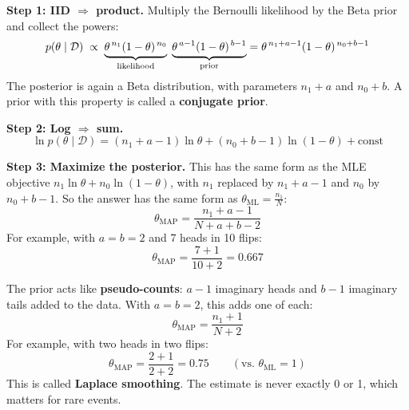 \begin{keeptogether}
\textbf{Step 1: IID $\Rightarrow$ product.} Multiply the Bernoulli likelihood by the Beta prior and collect the powers:
\[
p(\theta \mid \mathcal{D}) \;\propto\; \underbrace{\theta^{\,n_1}(1-\theta)^{\,n_0}}_{\makebox[0pt]{\scriptsize likelihood}}\;\underbrace{\theta^{\,a-1}(1-\theta)^{\,b-1}}_{\makebox[0pt]{\scriptsize prior}} = \theta^{\,n_1+a-1}(1-\theta)^{\,n_0+b-1}
\]
The posterior is again a Beta distribution, with parameters $n_1 + a$ and $n_0 + b$. A prior with this property is called a \textbf{conjugate prior}.
\end{keeptogether}

\begin{keeptogether}
\textbf{Step 2: Log $\Rightarrow$ sum.}
\[
\ln p(\theta \mid \mathcal{D}) = (n_1 + a - 1)\ln\theta + (n_0 + b - 1)\ln(1-\theta) + \text{const}
\]
\end{keeptogether}

\begin{keeptogether}
\textbf{Step 3: Maximize the posterior.} This has the same form as the MLE objective $n_1 \ln\theta + n_0\ln(1-\theta)$, with $n_1$ replaced by $n_1 + a - 1$ and $n_0$ by $n_0 + b - 1$. So the answer has the same form as $\theta_{\text{ML}} = \tfrac{n_1}{N}$:
\[
\theta_{\text{MAP}} = \frac{n_1 + a - 1}{N + a + b - 2}
\]
For example, with $a = b = 2$ and 7 heads in 10 flips:
\[
\theta_{\text{MAP}} = \frac{7 + 1}{10 + 2} = 0.667
\]
\end{keeptogether}

\begin{keeptogether}
The prior acts like \textbf{pseudo-counts}: $a - 1$ imaginary heads and $b - 1$ imaginary tails added to the data. With $a = b = 2$, this adds one of each:
\[
\theta_{\text{MAP}} = \frac{n_1 + 1}{N + 2}
\]
For example, with two heads in two flips:
\[
\theta_{\text{MAP}} = \frac{2 + 1}{2 + 2} = 0.75 \qquad (\text{vs. } \theta_{\text{ML}} = 1)
\]
This is called \textbf{Laplace smoothing}. The estimate is never exactly 0 or 1, which matters for rare events.
\end{keeptogether}

